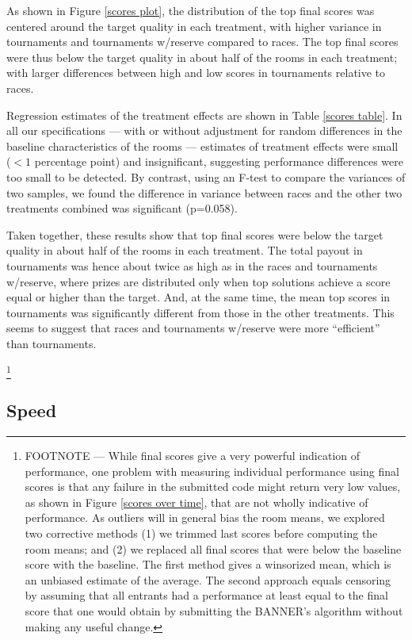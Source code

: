 \documentclass[11pt, titlepage]{article}
\begin{document}
As shown in Figure \ref{scores plot}, the distribution of the top final
scores was centered around the target quality in each treatment, with
higher variance in tournaments and tournaments w/reserve compared to
races. The top final scores were thus below the target quality in about
half of the rooms in each treatment; with larger differences between
high and low scores in tournaments relative to races.

Regression estimates of the treatment effects are shown in Table
\ref{scores table}. In all our specifications --- with or without
adjustment for random differences in the baseline characteristics of the
rooms --- estimates of treatment effects were small (\(<1\) percentage
point) and insignificant, suggesting performance differences were too
small to be detected. By contrast, using an F-test to compare the
variances of two samples, we found the difference in variance between
races and the other two treatments combined was significant (p=0.058).

Taken together, these results show that top final scores were below the
target quality in about half of the rooms in each treatment. The total
payout in tournaments was hence about twice as high as in the races and
tournaments w/reserve, where prizes are distributed only when top
solutions achieve a score equal or higher than the target. And, at the
same time, the mean top scores in tournaments was significantly
different from those in the other treatments. This seems to suggest that
races and tournaments w/reserve were more ``efficient'' than
tournaments.

\footnote{FOOTNOTE --- While final scores give a very powerful
  indication of performance, one problem with measuring individual
  performance using final scores is that any failure in the submitted
  code might return very low values, as shown in Figure
  \ref{scores over time}, that are not wholly indicative of performance.
  As outliers will in general bias the room means, we explored two
  corrective methods (1) we trimmed last scores before computing the
  room means; and (2) we replaced all final scores that were below the
  baseline score with the baseline. The first method gives a winsorized
  mean, which is an unbiased estimate of the average. The second
  approach equals censoring by assuming that all entrants had a
  performance at least equal to the final score that one would obtain by
  submitting the BANNER's algorithm without making any useful change.}

\subsection{Speed}\label{speed}
\end{document}
